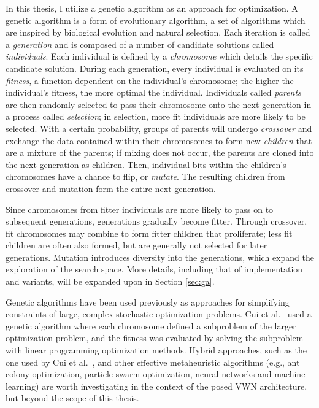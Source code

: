 \documentclass[12pt,dvipsnames]{report}
\begin{document}
In this thesis, I utilize a genetic algorithm as an approach for optimization.  A genetic algorithm is a form of evolutionary algorithm, a set of algorithms which are inspired by biological evolution and natural selection.  Each iteration is called a \emph{generation} and is composed of a number of candidate solutions called \emph{individuals}.  Each individual is defined by a \emph{chromosome} which details the specific candidate solution.  During each generation, every individual is evaluated on its \emph{fitness}, a function dependent on the individual's chromosome; the higher the individual's fitness, the more optimal the individual.  Individuals called \emph{parents} are then randomly selected to pass their chromosome onto the next generation in a process called \emph{selection}; in selection, more fit individuals are more likely to be selected.  With a certain probability, groups of parents will undergo \emph{crossover} and exchange the data contained within their chromosomes to form new \emph{children} that are a mixture of the parents; if mixing does not occur, the parents are cloned into the next generation as children.  Then, individual bits within the children's chromosomes have a chance to flip, or \emph{mutate}.  The resulting children from crossover and mutation form the entire next generation.

Since chromosomes from fitter individuals are more likely to pass on to subsequent generations, generations gradually become fitter.  Through crossover, fit chromosomes may combine to form fitter children that proliferate; less fit children are often also formed, but are generally not selected for later generations.  Mutation introduces diversity into the generations, which expand the exploration of the search space.  More details, including that of implementation and variants, will be expanded upon in Section \ref{sec:ga}.

Genetic algorithms have been used previously as approaches for simplifying constraints of large, complex stochastic optimization problems.  Cui et al.~\cite{7257198} used a genetic algorithm where each chromosome defined a subproblem of the larger optimization problem, and the fitness was evaluated by solving the subproblem with linear programming optimization methods.  Hybrid approaches, such as the one used by Cui et al.~\cite{7257198}, and other effective metaheuristic algorithms (e.g., ant colony optimization, particle swarm optimization, neural networks and machine learning) are worth investigating in the context of the posed VWN architecture, but beyond the scope of this thesis.
\end{document}
